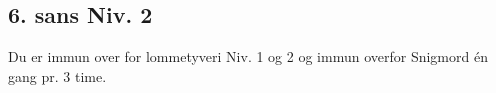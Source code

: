 \subsection*{6. sans Niv. 2}
Du er immun over for lommetyveri Niv. 1 og 2 og immun overfor Snigmord én gang pr. 3 time.\\